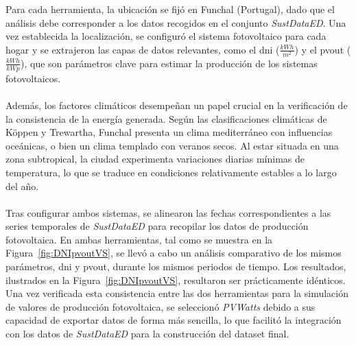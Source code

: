 Para cada herramienta, la ubicación se fijó en Funchal (Portugal), dado que el análisis debe corresponder a los datos recogidos en el conjunto \textit{SustDataED}. Una vez establecida la localización, se configuró el sistema fotovoltaico para cada hogar y se extrajeron las capas de datos relevantes, como el \gls{dni} ($\frac{kWh}{m^{2}}$) y el \gls{pvout} ($\frac{kWh}{kWp}$), que son parámetros clave para estimar la producción de los sistemas fotovoltaicos. \\
\\
Además, los factores climáticos desempeñan un papel crucial en la verificación de la consistencia de la energía generada. Según las clasificaciones climáticas de Köppen y Trewartha, Funchal presenta un clima mediterráneo con influencias oceánicas, o bien un clima templado con veranos secos. Al estar situada en una zona subtropical, la ciudad experimenta variaciones diarias mínimas de temperatura, lo que se traduce en condiciones relativamente estables a lo largo del año.\\
\\
Tras configurar ambos sistemas, se alinearon las fechas correspondientes a las series temporales de \textit{SustDataED} para recopilar los datos de producción fotovoltaica. En ambas herramientas, tal como se muestra en la Figura~\ref{fig:DNIpvoutVS}, se llevó a cabo un análisis comparativo de los mismos parámetros, \gls{dni} y \gls{pvout}, durante los mismos periodos de tiempo. Los resultados, ilustrados en la Figura~\ref{fig:DNIpvoutVS}, resultaron ser prácticamente idénticos. Una vez verificada esta consistencia entre las dos herramientas para la simulación de valores de producción fotovoltaica, se seleccionó \textit{PVWatts} debido a sus capacidad de exportar datos de forma más sencilla, lo que facilitó la integración con los datos de \textit{SustDataED} para la construcción del dataset final.

